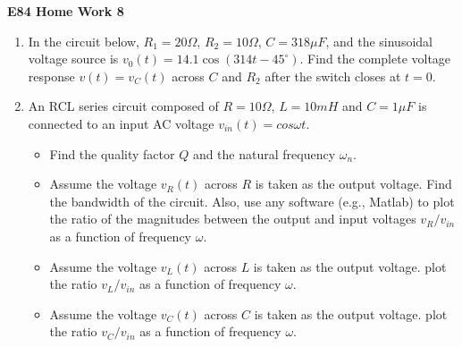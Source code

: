 \usepackage{html}

\begin{center}
{\Large \bf E84 Home Work 8}
\end{center}
\begin{enumerate}

\item In the circuit below, $R_1=20\Omega$, $R_2=10\Omega$, $C=318\mu F$,
  and the sinusoidal voltage source is $v_0(t)=14.1 \cos(314 t-45^{\circ})$.
  Find the complete voltage response $v(t)=v_C(t)$ across $C$ and $R_2$ after
  the switch closes at $t=0$.
  




\item An RCL series circuit composed of $R=10\Omega$, $L=10 mH$ and
  $C=1 \mu F$ is connected to an input AC voltage $v_{in}(t)=cos\omega t$.
  \begin{itemize}
  \item Find the quality factor $Q$ and the natural frequency $\omega_n$.
  \item Assume the voltage $v_R(t)$ across $R$ is taken as the output voltage.
    Find the bandwidth of the circuit. Also, use any software (e.g., Matlab) 
    to plot the ratio of the magnitudes between the output and input voltages 
    $v_R/v_{in}$ as a function of frequency $\omega$.
  \item Assume the voltage $v_L(t)$ across $L$ is taken as the output voltage.
    plot the ratio $v_L/v_{in}$ as a function of frequency $\omega$.
  \item Assume the voltage $v_C(t)$ across $C$ is taken as the output voltage.
    plot the ratio $v_C/v_{in}$ as a function of frequency $\omega$.
  \end{itemize}


\end{enumerate}
